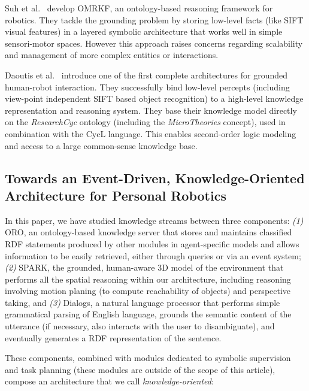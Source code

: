 \documentclass{svmult}
\begin{document}
Suh et al.~\cite{Suh2007} develop {\sc OMRKF}, an ontology-based reasoning
framework for robotics. They tackle the grounding problem by storing low-level
facts (like SIFT visual features) in a layered symbolic architecture that works
well in simple sensori-motor spaces. However this approach raises concerns
regarding scalability and management of more complex entities or interactions.

Daoutis et al.~\cite{Daoutis2009} introduce one of the first complete
architectures for grounded human-robot interaction. They successfully bind
low-level percepts (including view-point independent SIFT based object
recognition) to a high-level knowledge representation and reasoning system.
They base their knowledge model directly on the \textit{ResearchCyc} ontology
(including the \textit{MicroTheories} concept), used in combination with the
{\sc CycL} language. This enables second-order logic modeling and access to a
large common-sense knowledge base.


\subsection{Towards an Event-Driven, Knowledge-Oriented Architecture for Personal Robotics}

In this paper, we have studied knowledge streams between three components: {\it(1)}
{\sc ORO}, an ontology-based knowledge server that stores and maintains
classified RDF statements produced by other modules in agent-specific
models and allows information to be easily retrieved, either through queries or
via an event system; {\it(2)} {\sc SPARK}, the grounded, human-aware 3D model
of the environment that performs all the spatial reasoning within our
architecture, including reasoning involving motion planing (to compute
reachability of objects) and perspective taking, and {\it(3)} {\sc Dialogs}, a
natural language processor that performs simple grammatical parsing of English
language, grounds the semantic content of the utterance (if necessary, also
interacts with the user to disambiguate), and eventually generates a RDF
representation of the sentence.

These components, combined with modules dedicated to symbolic supervision and
task planning (these modules are outside of the scope of this article), compose
an architecture that we call \emph{knowledge-oriented}:
\end{document}

